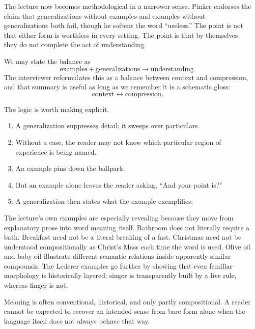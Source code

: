 The lecture now becomes methodological in a narrower sense. Pinker endorses the claim that generalizations without examples and examples without generalizations both fail, though he softens the word ``useless.'' The point is not that either form is worthless in every setting. The point is that by themselves they do not complete the act of understanding.

We may state the balance as
\begin{equation}
\text{examples} + \text{generalizations} \to \text{understanding}.
\end{equation}
The interviewer reformulates this as a balance between context and compression, and that summary is useful as long as we remember it is a schematic gloss:
\begin{equation}
\text{context} \leftrightarrow \text{compression}.
\end{equation}

The logic is worth making explicit.
\begin{enumerate}
\item A generalization suppresses detail; it sweeps over particulars.
\item Without a case, the reader may not know which particular region of experience is being named.
\item An example pins down the ballpark.
\item But an example alone leaves the reader asking, ``And your point is?''
\item A generalization then states what the example exemplifies.
\end{enumerate}

The lecture's own examples are especially revealing because they move from explanatory prose into word meaning itself. Bathroom does not literally require a bath. Breakfast need not be a literal breaking of a fast. Christmas need not be understood compositionally as Christ's Mass each time the word is used. Olive oil and baby oil illustrate different semantic relations inside apparently similar compounds. The Lederer examples go further by showing that even familiar morphology is historically layered: singer is transparently built by a live rule, whereas finger is not.

\begin{remark}
Meaning is often conventional, historical, and only partly compositional. A reader cannot be expected to recover an intended sense from bare form alone when the language itself does not always behave that way.
\end{remark}

